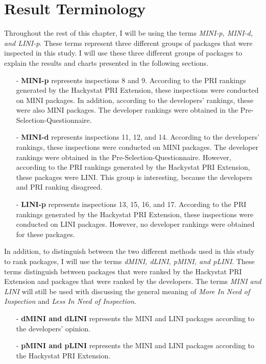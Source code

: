 \clearpage
\section{Result Terminology}
\label{section:terminology}
Throughout the rest of this chapter, I will be using the terms
\textit{MINI-p, MINI-d, and LINI-p}. These terms represent three different
groups of packages that were inspected in this study. I will use these
three different groups of packages to explain the results and charts
presented in the following sections.

\begin{itemize}
\item[-] \textbf{MINI-p} represents inspections 8 and 9.  According to the
  PRI rankings generated by the Hackystat PRI Extension, these inspections
  were conducted on MINI packages. In addition, according to the
  developers' rankings, these were also MINI packages. The developer
  rankings were obtained in the Pre-Selection-Questionnaire.
\item[-] \textbf{MINI-d} represents inspections 11, 12, and 14. According
  to the developers' rankings, these inspections were conducted on MINI
  packages. The developer rankings were obtained in the
  Pre-Selection-Questionnaire. However, according to the PRI rankings
  generated by the Hackystat PRI Extension, these packages were LINI. This
  group is interesting, because the developers and PRI ranking disagreed. 
\item[-] \textbf{LINI-p} represents inspections 13, 15, 16, and 17.
  According to the PRI rankings generated by the Hackystat PRI Extension,
  these inspections were conducted on LINI packages. However, no developer
  rankings were obtained for these packages.
\end{itemize}

In addition, to distinguish between the two different methods used in this
study to rank packages, I will use the terms \textit{dMINI, dLINI, pMINI,
  and pLINI}. These terms distinguish between packages that were ranked by
the Hackystat PRI Extension and packages that were ranked by the
developers. The terms \textit{MINI and LINI} will still be used with
discussing the general meaning of \textit{More In Need of Inspection} and
\textit{Less In Need of Inspection}.

\begin{itemize}
\item[-] \textbf{dMINI and dLINI} represents the MINI and LINI packages 
  according to the developers' opinion. 
\item[-] \textbf{pMINI and pLINI} represents the MINI and LINI packages
  according to the Hackystat PRI Extension. 
\end{itemize}


